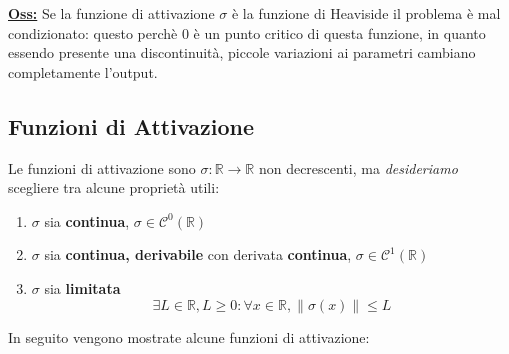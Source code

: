 \documentclass[a4paper,12pt]{article}
\newcommand{\osservazione}{\noindent\textbf{\underline{Oss:}} }
\begin{document}
	\osservazione Se la funzione di attivazione $\sigma$ è la funzione di Heaviside il problema è mal condizionato: questo perchè 0 è un punto critico di questa funzione, in quanto essendo presente una discontinuità, piccole variazioni ai parametri cambiano completamente l'output.

	\subsection{Funzioni di Attivazione}

	Le funzioni di attivazione sono $\sigma : \mathbb{R} \rightarrow \mathbb{R}$ non decrescenti, ma \textit{desideriamo} scegliere tra alcune proprietà utili:

	\begin{enumerate}
		\item $\sigma $ sia \textbf{continua}, $\sigma \in \mathcal{C}^0(\mathbb{R})$
		\item $\sigma $ sia \textbf{continua, derivabile} con derivata \textbf{continua}, $\sigma \in \mathcal{C}^1(\mathbb{R})$
		\item $\sigma$ sia \textbf{limitata}
		\[
		\exists L \in \mathbb{R}, L \geq 0 : \forall x \in \mathbb{R}, \| \sigma(x) \| \leq L
		\]
	\end{enumerate}

	In seguito vengono mostrate alcune funzioni di attivazione:
\end{document}
